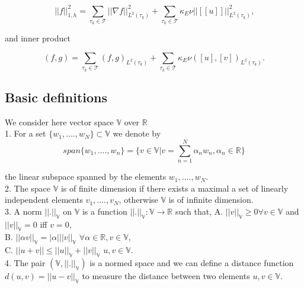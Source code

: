 \documentclass[a4paper,twoside,openright]{book}
\begin{document}
\begin{appendices}
\begin{equation}
||f||_{1,h}^2 = \sum_{\tau_k \in \mathcal{T}} ||\nabla f||_{L^2(\tau_k)}^2 + \sum_{\tau_k \in \mathcal{T}} \kappa_E \nu ||[[u]]||_{L^2 (\tau_k)}^2 \textrm{,}
\end{equation}

and inner product

\begin{equation}
(f,g) = \sum_{\tau_k \in \mathcal{T}} (f,g)_{L^2(\tau_k)} + \sum_{\tau_k \in \mathcal{T}} \kappa_E \nu ([u],[v])_{L^2 (\tau_k)} \textrm{.}
\end{equation}

\subsection{Basic definitions}

We consider here vector space $\mathbb{V}$ over $\mathbb{R}$\\

1. For a set $\lbrace w_1,....,w_N \rbrace \subset \mathbb{V}$ we denote by \\
\begin{equation} \label{vector space}
span \lbrace w_1,....,w_n \rbrace = \lbrace v \in \mathbb{V} | v = \sum_{n=1}^N \alpha_n w_n, \alpha_n \in \mathbb{R} \rbrace
\end{equation} 

the linear subspace spanned by the elements $w_1,....,w_N$.\\

2. The space $\mathbb{V}$ is of finite dimension if there exists a maximal a set of linearly independent elements $v_1,....,v_N$, otherwise $\mathbb{V}$ is of infinite dimension.\\

3. A norm $||.||_\mathbb{V}$ on $\mathbb{V}$ is a function $||.||_\mathbb{V} : \mathbb{V} \rightarrow \mathbb{R}$ such that,
\noindent
A. $||v||_\mathbb{V} \geq 0 \forall v \in \mathbb{V}$ and $||v||_\mathbb{V} = 0$ iff $v=0$,\\
B. $||\alpha v||_\mathbb{V} = |\alpha| ||v||_\mathbb{V}$  $\forall \alpha \in \mathbb{R}, v \in \mathbb{V}$,\\
C. $||u+v|| \leq ||u||_\mathbb{V} + ||v||_\mathbb{V}$ $u,v \in \mathbb{V}$.\\

4. The pair $(\mathbb{V},||.||_\mathbb{V})$ is a normed space and we can define a distance function $d(u,v) = ||u-v||_\mathbb{V}$ to measure the distance between two elements $u,v \in \mathbb{V}$.\\


\end{appendices}
\end{document}
